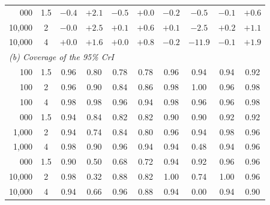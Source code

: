 \begin{tabular}{r c cccc cccc}
\addlinespace
10{,}000 & 1.5 & $-0.4$ & ${+}2.1$ & $-0.5$ & ${+}0.0$ & $-0.2$ & $-0.5$ & $-0.1$ & ${+}0.6$ \\
10{,}000 & 2 & $-0.0$ & ${+}2.5$ & ${+}0.1$ & ${+}0.6$ & ${+}0.1$ & $-2.5$ & ${+}0.2$ & ${+}1.1$ \\
10{,}000 & 4 & ${+}0.0$ & ${+}1.6$ & ${+}0.0$ & ${+}0.8$ & $-0.2$ & $-11.9$ & $-0.1$ & ${+}1.9$ \\
\midrule
\multicolumn{10}{l}{\textit{(b) Coverage of the 95\% CrI}} \\
100 & 1.5 & 0.96 & 0.80 & 0.78 & 0.78 & 0.96 & 0.94 & 0.94 & 0.92 \\
100 & 2 & 0.96 & 0.90 & 0.84 & 0.86 & 0.98 & 1.00 & 0.96 & 0.98 \\
100 & 4 & 0.98 & 0.98 & 0.96 & 0.94 & 0.98 & 0.96 & 0.96 & 0.98 \\
\addlinespace
1{,}000 & 1.5 & 0.94 & 0.84 & 0.82 & 0.82 & 0.90 & 0.90 & 0.92 & 0.92 \\
1{,}000 & 2 & 0.94 & 0.74 & 0.84 & 0.80 & 0.96 & 0.94 & 0.98 & 0.96 \\
1{,}000 & 4 & 0.98 & 0.90 & 0.96 & 0.94 & 0.94 & 0.48 & 0.94 & 0.96 \\
\addlinespace
10{,}000 & 1.5 & 0.90 & 0.50 & 0.68 & 0.72 & 0.94 & 0.92 & 0.96 & 0.96 \\
10{,}000 & 2 & 0.98 & 0.32 & 0.88 & 0.82 & 1.00 & 0.74 & 1.00 & 0.96 \\
10{,}000 & 4 & 0.94 & 0.66 & 0.96 & 0.88 & 0.94 & 0.00 & 0.94 & 0.90 \\
\bottomrule
\end{tabular}
